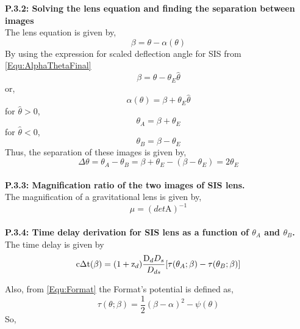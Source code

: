  \textbf{P.3.2: Solving the lens equation and finding the separation between images}\\
 
 The lens equation is given by,
 \begin{equation}
 \beta=\theta-\alpha(\theta)
 \end{equation}
 By using the expression for scaled deflection angle for SIS from \ref{Equ:AlphaThetaFinal}
 \begin{equation}
 \beta=\theta-\theta_{E}\hat{\theta}
 \end{equation}
 or, 
 \begin{equation}
 \alpha(\theta)=\beta+\theta_{E}\hat{\theta}
 \end{equation}
 for $ \hat{\theta}>0 $,
 \begin{equation}
 \theta_{A}=\beta + \theta_{E}
 \label{Equ:ThetaA}
 \end{equation}
 for $ \hat{\theta}<0 $,
 \begin{equation}
 \theta_{B}=\beta -\theta_{E}
 \label{Equ:ThetaB}
 \end{equation}
 Thus, the separation of these  images is given by,
 \begin{equation}
 \Delta\theta= \theta_{A}- \theta_{B} = \beta+\theta_{E}-(\beta-\theta_{E})= 2\theta_{E}
 \end{equation}
 \\
 
 \textbf{P.3.3: Magnification ratio of the two images of SIS lens.}\\
 
 The magnification of a gravitational lens is given by,
 \begin{equation}
 \mu=(det \text{A})^{-1}
 \end{equation}\\
 
 
 
 
 
 \textbf{P.3.4: Time delay derivation for SIS lens as a function of $ \theta_{A}$ and $ \theta_{B}$.}\\
 
 The time delay is given by\cite{manual}
 \begin{equation}
 \text{c}\Delta\text{t}(\beta)=(1+ \text{z}_{d})\frac{\text D_{d}D_{s}}{D_{ds}}[\tau(\theta_{A};\beta) - \tau(\theta_{B}; \beta)]
 \label{Equ:timeDelay}
 \end{equation}
 
 Also, from \ref{Equ:Format} the Format's potential is defined as,
 \begin{equation}
 \tau(\theta; \beta)=\frac{1}{2}(\beta -\alpha)^2 -\psi(\theta)
 \end{equation}
 So,
 
